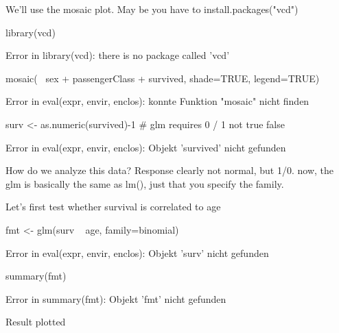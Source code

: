\documentclass[a4paper,twoside]{tufte-book}\usepackage[]{graphicx}\usepackage[]{color}
\begin{document}
\begin{appendices}
We'll use the mosaic plot. May be you have to install.packages("vcd")

\begin{Schunk}
\begin{Sinput}
library(vcd)
\end{Sinput}
\begin{Soutput}
Error in library(vcd): there is no package called 'vcd'
\end{Soutput}
\begin{Sinput}
mosaic(~ sex + passengerClass + survived, shade=TRUE, legend=TRUE) 
\end{Sinput}
\begin{Soutput}
Error in eval(expr, envir, enclos): konnte Funktion "mosaic" nicht finden
\end{Soutput}
\begin{Sinput}
surv <- as.numeric(survived)-1 # glm requires 0 / 1 not true false
\end{Sinput}
\begin{Soutput}
Error in eval(expr, envir, enclos): Objekt 'survived' nicht gefunden
\end{Soutput}
\end{Schunk}

How do we analyze this data? Response clearly not normal, but 1/0. now, the glm is basically the same as lm(), just that you specify the family.

Let's first test whether survival is correlated to age

\begin{Schunk}
\begin{Sinput}
fmt <- glm(surv ~ age, family=binomial)
\end{Sinput}
\begin{Soutput}
Error in eval(expr, envir, enclos): Objekt 'surv' nicht gefunden
\end{Soutput}
\begin{Sinput}
summary(fmt)
\end{Sinput}
\begin{Soutput}
Error in summary(fmt): Objekt 'fmt' nicht gefunden
\end{Soutput}
\end{Schunk}

Result plotted 


\end{appendices}
\end{document}
